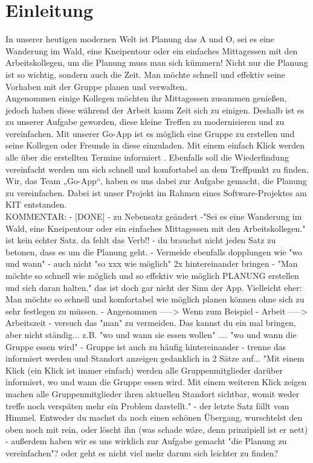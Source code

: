 \section{Einleitung}
In unserer heutigen modernen Welt ist Planung das A und O, sei es eine Wanderung im Wald, eine Kneipentour oder ein einfaches Mittagessen mit den Arbeitskollegen, um die Planung muss man sich kümmern! 
Nicht nur die Planung ist so wichtig, sondern auch die Zeit. Man möchte schnell und effektiv seine Vorhaben mit der Gruppe planen und verwalten.\\
Angenommen einige Kollegen möchten ihr Mittagessen zusammen genießen, jedoch haben diese während der Arbeit kaum Zeit sich zu einigen. Deshalb ist es zu unserer Aufgabe geworden, diese kleine Treffen zu modernisieren und zu vereinfachen. Mit unserer Go-App ist es möglich eine Gruppe zu erstellen und seine Kollegen oder Freunde in diese einzuladen. Mit einem einfach Klick werden alle über die erstellten Termine informiert . Ebenfalls soll die Wiederfindung vereinfacht werden um sich schnell und komfortabel an dem Treffpunkt zu finden.\\
Wir, das Team „Go-App“, haben es uns dabei zur Aufgabe gemacht, die Planung zu vereinfachen. Dabei ist unser Projekt im Rahmen eines Software-Projektes am KIT entstanden. \\

KOMMENTAR:
- [DONE] - zu Nebensatz geändert   -"Sei es eine Wanderung im Wald, eine Kneipentour oder ein einfaches Mittagessen mit den Arbeitskollegen." ist kein echter Satz. da fehlt das Verb!!
- du brauchst nicht jeden Satz zu betonen, dass es um die Planung geht.
- Vermeide ebenfalls dopplungen wie "wo und wann"
- auch nicht "so xxx wie möglich"  2x hintereinander bringen 
- "Man möchte so schnell wie möglich und so effektiv wie möglich PLANUNG erstellen und sich daran halten." das ist doch gar nicht der Sinn der App. Vielleicht eher: Man möchte so schnell und komfortabel 	wie möglich planen können ohne sich zu sehr festlegen zu müssen.
- Angenommen    -----> Wenn zum Beispiel
- Arbeit        -----> Arbeitszeit
- versuch das "man" zu vermeiden. Das kannst du ein mal bringen, aber nicht ständig... z.B. "wo und wann sie essen wollen"     .... "wo und wann die Gruppe essen wird"
- Gruppe ist auch zu häufig hintereinander
- trenne das informiert werden und Standort anzeigen gedanklich in 2 Sätze auf... "Mit einem Klick (ein Klick ist immer einfach) werden alle Gruppenmitglieder darüber informiert, wo und wann die Gruppe essen wird. Mit einem weiteren Klick zeigen machen alle Gruppenmitglieder ihren aktuellen Standort sichtbar, womit weder treffe noch verspäten mehr ein Problem darstellt."
- der letzte Satz fällt vom Himmel. Entweder du machst da noch einen schönen Übergang, wurschtelst den oben noch mit rein, oder löscht ihn (was schade wäre, denn prinzipiell ist er nett)
- außerdem haben wir es uns wirklich zur Aufgabe gemacht "die Planung zu vereinfachen"? oder geht es nicht viel mehr darum sich leichter zu finden?